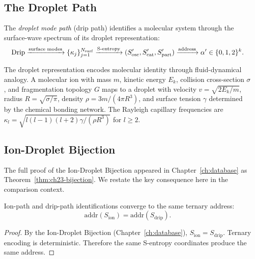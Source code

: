 \subsection{The Droplet Path}
\label{sec:ch24-drip-path}

\begin{definition}
\label{def:ch24-drip-path}
The \emph{droplet mode path} (drip path) identifies a molecular system
through the surface-wave spectrum of its droplet representation:
\begin{equation}
\label{eq:ch24-drip-path}
  \text{Drip} \xrightarrow{\text{surface modes}}
  \{\kappa_j\}_{j=1}^{N_{\mathrm{surf}}} \xrightarrow{\text{S-entropy}}
  (S_{\mathrm{osc}}', S_{\mathrm{cat}}', S_{\mathrm{part}}') \xrightarrow{\text{address}}
  \alpha' \in \{0,1,2\}^k.
\end{equation}
\end{definition}

The droplet representation encodes molecular identity through fluid-dynamical
analogy.  A molecular ion with mass $m$, kinetic energy $E_k$, collision
cross-section $\sigma$, and fragmentation topology $G$ maps to a droplet with
velocity $v = \sqrt{2E_k/m}$, radius $R = \sqrt{\sigma/\pi}$, density
$\rho = 3m/(4\pi R^3)$, and surface tension $\gamma$ determined by the
chemical bonding network.  The Rayleigh capillary frequencies are
$\kappa_l = \sqrt{l(l-1)(l+2)\gamma/(\rho R^3)}$ for $l \geq 2$.

\subsection{Ion-Droplet Bijection}
\label{sec:ch24-bijection}

The full proof of the Ion-Droplet Bijection appeared in Chapter~\ref{ch:database}
as Theorem~\ref{thm:ch23-bijection}.  We restate the key consequence here
in the comparison context.

\begin{theorem}
\label{thm:ch24-dual-conv}
Ion-path and drip-path identifications converge to the same ternary address:
\[
  \mathrm{addr}(S_{\mathrm{ion}}) = \mathrm{addr}(S_{\mathrm{drip}}).
\]
\end{theorem}

\begin{proof}
By the Ion-Droplet Bijection (Chapter~\ref{ch:database}),
$S_{\mathrm{ion}} = S_{\mathrm{drip}}$.  Ternary encoding is deterministic.
Therefore the same S-entropy coordinates produce the same address.
\end{proof}

